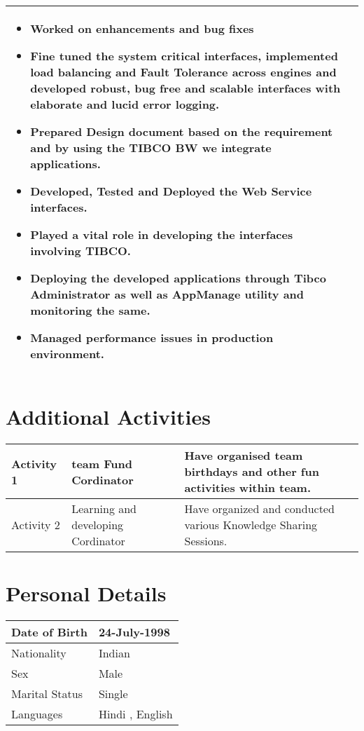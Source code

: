 \documentclass{article}
\begin{document}
\begin{tabular}{ |p{3cm}|p{11.5cm}|}
\begin{itemize}
\item Worked on enhancements and bug fixes 
\item Fine tuned the system critical interfaces, implemented load balancing and Fault Tolerance across engines and developed robust, bug free and scalable interfaces with elaborate and lucid error logging.
\item Prepared Design document based on the requirement and by using the TIBCO BW we integrate applications. 
\item Developed, Tested and Deployed the Web Service interfaces.
\item Played a vital role in developing the interfaces involving TIBCO.
\item Deploying the developed applications through Tibco Administrator as well as AppManage utility and monitoring the same.
\item Managed performance issues in production environment.


\end{itemize} \\
\hline
\end{tabular}


\renewcommand{\arraystretch}{2.5}
\section{Additional Activities}
\begin{tabular}{ |p{3cm}|p{6cm}|p{6cm}|}
\hline
Activity 1 & team Fund Cordinator & Have organised team birthdays and other fun activities within team. \\
\hline
Activity 2 & Learning and developing Cordinator & Have organized and conducted various Knowledge Sharing Sessions.\\
\hline
\end{tabular}


\renewcommand{\arraystretch}{2.5}
\section{Personal Details}
\begin{tabular}{ |p{5cm}|p{10cm}|}
\hline
Date of Birth & 24-July-1998 \\
\hline
Nationality & Indian \\
\hline
Sex & Male\\
\hline
Marital Status & Single\\
\hline
Languages & Hindi , English\\
\hline
\end{tabular}
\end{document}
